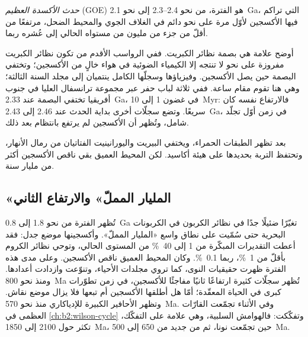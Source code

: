 \begin{definition}\label{def:b2:precambrian-earth:goe}
\emph{حدث الأكسدة العظيم} (GOE) هو الفترة، من نحو
2.4--2.3 إلى نحو \qty{2.1}{Ga}، التي تراكم فيها الأكسجين لأوّل مرة على نحو دائم في
الغلاف الجوي والمحيط الضحل، مرتفعًا من أقلّ من جزء من مليون من مستواه الحالي إلى
عُشره ربما.
\end{definition}

أوضح علامة هي بصمة نظائر الكبريت. ففي الرواسب الأقدم من  تكون
نظائر الكبريت مفروزة على نحو لا تنتجه إلا الكيمياء الضوئية في هواء خالٍ من الأكسجين؛
وتختفي البصمة حين يصل الأكسجين. وفيزياؤها وسجلّها الكامل ينتميان
إلى مجلد السنة الثالثة؛ وهي هنا تقوم مقام ساعة. ففي ثلاثة لباب حفر عبر مجموعة ترانسفال
العليا في جنوب أفريقيا تختفي البصمة عند \qty{2.33}{Ga}، في غضون 1 إلى \qty{10}{Myr}:
فالارتفاع نفسه كان سريعًا. وتضع سجلّات أخرى بداية الحدث عند 2.46 إلى \qty{2.43}{Ga}،
في زمن أوّل تجلّد شامل، وتُظهر أن الأكسجين لم يرتفع بانتظام
بعد ذلك.

بعد  تظهر الطبقات الحمراء، ويختفي البيريت واليورانينيت الفتاتيان من رمال الأنهار،
وتحتفظ التربة بحديدها على هيئة أكاسيد. لكن المحيط العميق بقي ناقص الأكسجين أكثر من مليار
سنة.

\subsection*{«المليار المملّ» والارتفاع الثاني}

تُظهر الفترة من نحو 1.8 إلى \qty{0.8}{Ga} تغيّرًا ضئيلًا جدًا في نظائر الكربون في
الكربونات البحرية حتى سُمّيت على نطاق واسع «المليار المملّ». وأكسجينها موضع جدل: فقد أعطت التقديرات
المبكّرة من 1 إلى \qty{40}{\percent} من المستوى الحالي، وتوحي نظائر الكروم بأقلّ من
\qty{1}{\percent}، ربما \qty{0.1}{\percent}. وكان المحيط العميق ناقص الأكسجين. وعلى مدى هذه الفترة
ظهرت حقيقيات النوى، كما تروي مجلدات الأحياء، وتنوّعت وازدادت أعدادها. ومنذ نحو \qty{800}{Ma} تُظهر سجلّات كثيرة
ارتفاعًا ثانيًا مفاجئًا للأكسجين، في زمن تطوّرات كبرى في الحياة المعقّدة؛ أمّا هل
أطلقها الأكسجين أم تبعها فلا يزال موضع نقاش. وتظهر الأحافير الكبيرة للإدياكاري
منذ نحو \qty{570}{Ma}. وفي الأثناء تجمّعت القارّات العظمى في \cref{ch:b2:wilson-cycle}
وتفكّكت: فالهوامش السلبية، وهي علامة على التفكّك، تكثر حول 2100 إلى
\qty{1850}{Ma}، حين تجمّعت نونا، ثم من جديد من 650 إلى \qty{500}{Ma}.

